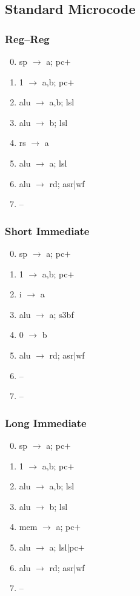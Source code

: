 \documentclass[11pt]{book}
\begin{document}
\subsection*{Standard Microcode}
\begin{multicols}{3}\ttfamily\selectfont\small
  \subsubsection*{Reg--Reg}
  \begin{enumerate}\setcounter{enumi}{-1}
  \item sp \(\rightarrow\) a; pc\(+\)
  \item 1 \(\rightarrow\) a,b; pc\(+\)
  \item alu \(\rightarrow\) a,b; lsl
  \item alu \(\rightarrow\) b; lsl
  \item rs \(\rightarrow\) a
  \item alu \(\rightarrow\) a; lsl
  \item alu \(\rightarrow\) rd; asr|wf
  \item --
  \end{enumerate}
  \columnbreak
  \subsubsection*{Short Immediate}
  \begin{enumerate}\setcounter{enumi}{-1}
  \item sp \(\rightarrow\) a; pc\(+\)
  \item 1 \(\rightarrow\) a,b; pc\(+\)
  \item i \(\rightarrow\) a
  \item alu \(\rightarrow\) a; s3bf
  \item 0 \(\rightarrow\) b
  \item alu \(\rightarrow\) rd; asr|wf
  \item --
  \item --
  \end{enumerate}
  \columnbreak
  \subsubsection*{Long Immediate}
  \begin{enumerate}\setcounter{enumi}{-1}
  \item sp \(\rightarrow\) a; pc\(+\)
  \item 1 \(\rightarrow\) a,b; pc\(+\)
  \item alu \(\rightarrow\) a,b; lsl
  \item alu \(\rightarrow\) b; lsl
  \item mem \(\rightarrow\) a; pc\(+\)
  \item alu \(\rightarrow\) a; lsl|pc\(+\)
  \item alu \(\rightarrow\) rd; asr|wf
  \item --
  \end{enumerate}
\end{multicols}
\end{document}
